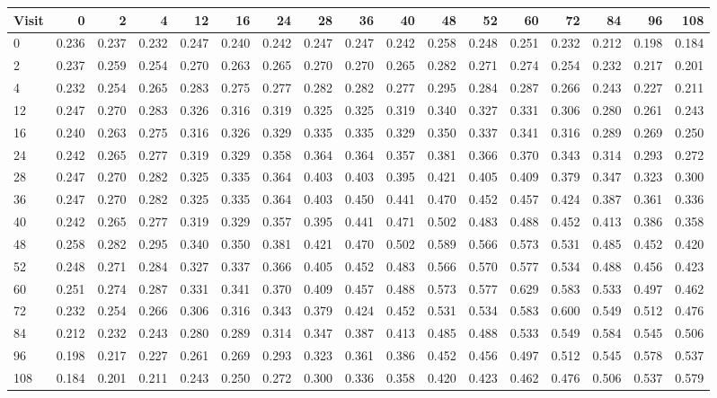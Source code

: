 \small
\begin{tabular}{lrrrrrrrrrrrrrrrr}
\hline
Visit & 0 & 2 & 4 & 12 & 16 & 24 & 28 & 36 & 40 & 48 & 52 & 60 & 72 & 84 & 96 & 108 \\
\hline
0 & 0.236 & 0.237 & 0.232 & 0.247 & 0.240 & 0.242 & 0.247 & 0.247 & 0.242 & 0.258 & 0.248 & 0.251 & 0.232 & 0.212 & 0.198 & 0.184 \\
2 & 0.237 & 0.259 & 0.254 & 0.270 & 0.263 & 0.265 & 0.270 & 0.270 & 0.265 & 0.282 & 0.271 & 0.274 & 0.254 & 0.232 & 0.217 & 0.201 \\
4 & 0.232 & 0.254 & 0.265 & 0.283 & 0.275 & 0.277 & 0.282 & 0.282 & 0.277 & 0.295 & 0.284 & 0.287 & 0.266 & 0.243 & 0.227 & 0.211 \\
12 & 0.247 & 0.270 & 0.283 & 0.326 & 0.316 & 0.319 & 0.325 & 0.325 & 0.319 & 0.340 & 0.327 & 0.331 & 0.306 & 0.280 & 0.261 & 0.243 \\
16 & 0.240 & 0.263 & 0.275 & 0.316 & 0.326 & 0.329 & 0.335 & 0.335 & 0.329 & 0.350 & 0.337 & 0.341 & 0.316 & 0.289 & 0.269 & 0.250 \\
24 & 0.242 & 0.265 & 0.277 & 0.319 & 0.329 & 0.358 & 0.364 & 0.364 & 0.357 & 0.381 & 0.366 & 0.370 & 0.343 & 0.314 & 0.293 & 0.272 \\
28 & 0.247 & 0.270 & 0.282 & 0.325 & 0.335 & 0.364 & 0.403 & 0.403 & 0.395 & 0.421 & 0.405 & 0.409 & 0.379 & 0.347 & 0.323 & 0.300 \\
36 & 0.247 & 0.270 & 0.282 & 0.325 & 0.335 & 0.364 & 0.403 & 0.450 & 0.441 & 0.470 & 0.452 & 0.457 & 0.424 & 0.387 & 0.361 & 0.336 \\
40 & 0.242 & 0.265 & 0.277 & 0.319 & 0.329 & 0.357 & 0.395 & 0.441 & 0.471 & 0.502 & 0.483 & 0.488 & 0.452 & 0.413 & 0.386 & 0.358 \\
48 & 0.258 & 0.282 & 0.295 & 0.340 & 0.350 & 0.381 & 0.421 & 0.470 & 0.502 & 0.589 & 0.566 & 0.573 & 0.531 & 0.485 & 0.452 & 0.420 \\
52 & 0.248 & 0.271 & 0.284 & 0.327 & 0.337 & 0.366 & 0.405 & 0.452 & 0.483 & 0.566 & 0.570 & 0.577 & 0.534 & 0.488 & 0.456 & 0.423 \\
60 & 0.251 & 0.274 & 0.287 & 0.331 & 0.341 & 0.370 & 0.409 & 0.457 & 0.488 & 0.573 & 0.577 & 0.629 & 0.583 & 0.533 & 0.497 & 0.462 \\
72 & 0.232 & 0.254 & 0.266 & 0.306 & 0.316 & 0.343 & 0.379 & 0.424 & 0.452 & 0.531 & 0.534 & 0.583 & 0.600 & 0.549 & 0.512 & 0.476 \\
84 & 0.212 & 0.232 & 0.243 & 0.280 & 0.289 & 0.314 & 0.347 & 0.387 & 0.413 & 0.485 & 0.488 & 0.533 & 0.549 & 0.584 & 0.545 & 0.506 \\
96 & 0.198 & 0.217 & 0.227 & 0.261 & 0.269 & 0.293 & 0.323 & 0.361 & 0.386 & 0.452 & 0.456 & 0.497 & 0.512 & 0.545 & 0.578 & 0.537 \\
108 & 0.184 & 0.201 & 0.211 & 0.243 & 0.250 & 0.272 & 0.300 & 0.336 & 0.358 & 0.420 & 0.423 & 0.462 & 0.476 & 0.506 & 0.537 & 0.579 \\
\hline
\end{tabular}
